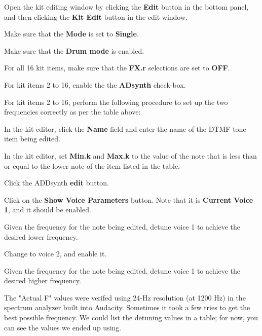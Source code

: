    \begin{enumber}
      \item Open the kit editing window by clicking the \textbf{Edit}
         button in the bottom panel, and then clicking the
         \textbf{Kit Edit} button in the edit window.
      \item Make sure that the \textbf{Mode} is set to \textbf{Single}.
      \item Make sure that the \textbf{Drum mode} is enabled.
      \item For all 16 kit items, make sure that the \textbf{FX.r}
         selections are set to \textbf{OFF}.
      \item For kit items 2 to 16, enable the the \textbf{ADsynth}
         check-box.
      \item For kit items 2 to 16, perform the following procedure to set up
         the two frequencies correctly as per the table above:
         \begin{enumber}
            \item In the kit editor, click the \textbf{Name} field and enter
               the name of the DTMF tone item being edited.
            \item In the kit editor, set \textbf{Min.k} and \textbf{Max.k}
               to the value of the note that is less than or equal to the
               lower note of the item listed in the table.
            \item Click the ADDsynth \textbf{edit} button.
            \item Click on the \textbf{Show Voice Parameters} button.
               Note that it is \textbf{Current Voice 1}, and it should be
               enabled.
            \item Given the frequency for the note being edited, detune
               voice 1 to achieve the desired lower frequency.
            \item Change to voice 2, and enable it.
            \item Given the frequency for the note being edited, detune
               voice 1 to achieve the desired higher frequency.
         \end{enumber}
   \end{enumber}

   The "Actual F" values were verifed using 24-Hz resolution (at 1200 Hz)
   in the spectrum analyzer built into
   Audacity.
   Sometimes it took a few
   tries to get the best possible frequency.  We could list the detuning
   values in a table; for now, you can see the values we ended up using.

